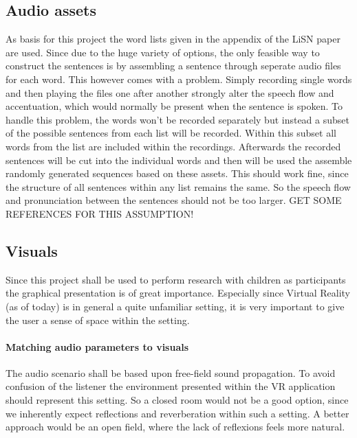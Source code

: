 \documentclass[a4paper,11pt]{article}%
\renewcommand{\\}{\vspace*{0.5\baselineskip} \newline}
\begin{document}
\subsection{Audio assets}
\label{sec:audio_assets}
As basis for this project the word lists given in the appendix of the LiSN paper \cite{lins} are used. Since due to the huge variety of options, the only feasible way to construct the sentences is by assembling a sentence through seperate audio files for each word. This however comes with a problem. Simply recording single words and then playing the files one after another strongly alter the speech flow and accentuation, which would normally be present when the sentence is spoken.
\newline
\newline
To handle this problem, the words won't be recorded separately but instead a subset of the possible sentences from each list will be recorded. Within this subset all words from the list are included within the recordings. Afterwards the recorded sentences will be cut into the individual words and then will be used the assemble randomly generated sequences based on these assets. This should work fine, since the structure of all sentences within any list remains the same. So the speech flow and pronunciation between the sentences should not be too larger. GET SOME REFERENCES FOR THIS ASSUMPTION!


\subsection{Visuals}
\label{sec:visuals}
Since this project shall be used to perform research with children as participants the graphical presentation is of great importance. Especially since Virtual Reality (as of today) is in general a quite unfamiliar setting, it is very important to give the user a sense of space within the setting.

\paragraph{Matching audio parameters to visuals} The audio scenario shall be based upon free-field sound propagation. To avoid confusion of the listener the environment presented within the VR application should represent this setting. So a closed room would not be a good option, since we inherently expect reflections and reverberation within such a setting. A better approach would be an open field, where the lack of reflexions feels more natural.
\end{document}
